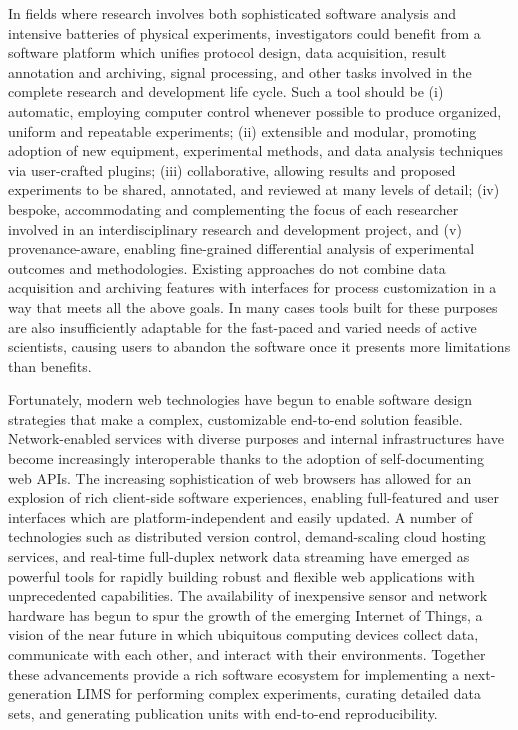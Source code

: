 In fields where research involves both sophisticated software analysis
and intensive batteries of physical experiments, investigators could
benefit from a software platform which unifies protocol design, data
acquisition, result annotation and archiving, signal processing, and
other tasks involved in the complete research and development life
cycle. Such a tool should be (i) automatic, employing computer control
whenever possible to produce organized, uniform and repeatable
experiments; (ii) extensible and modular, promoting adoption of new
equipment, experimental methods, and data analysis techniques via
user-crafted plugins; (iii) collaborative, allowing results and
proposed experiments to be shared, annotated, and reviewed at many
levels of detail; (iv) bespoke, accommodating and complementing the
focus of each researcher involved in an interdisciplinary research and
development project, and (v) provenance-aware, enabling fine-grained
differential analysis of experimental outcomes and
methodologies. Existing approaches do not combine data acquisition and
archiving features with interfaces for process customization in a way
that meets all the above goals. In many cases tools built for
these purposes are also insufficiently adaptable for the fast-paced
and varied needs of active scientists, causing users to abandon the
software once it presents more limitations than benefits.

Fortunately, modern web technologies have begun
to enable software design strategies that make a complex, customizable
end-to-end solution feasible. Network-enabled services with
diverse purposes and internal infrastructures have become increasingly
interoperable thanks to the adoption of self-documenting web APIs. The
increasing sophistication of web browsers has allowed for an
explosion of rich client-side software experiences, enabling
full-featured and user interfaces which are platform-independent and easily
updated. A number of technologies such as distributed version control,
demand-scaling cloud hosting services, and real-time full-duplex
network data streaming have emerged as powerful tools for
rapidly building robust and flexible web applications with
unprecedented capabilities. The
availability of inexpensive sensor and network hardware has begun to
spur the growth of the emerging Internet of Things, a vision of the
near future in which ubiquitous computing devices collect data,
communicate with each other, and interact with their environments.
Together these advancements provide a rich software ecosystem for
implementing a next-generation LIMS for performing complex
experiments, curating detailed data sets, and generating publication
units with end-to-end reproducibility.

